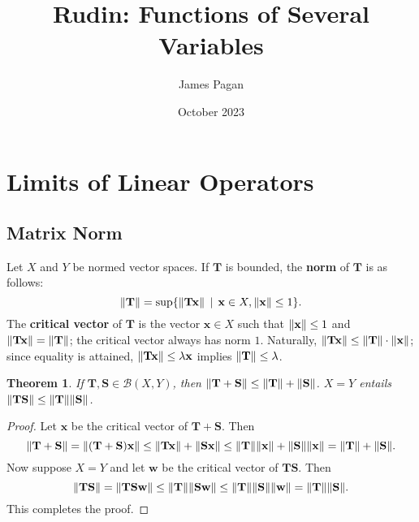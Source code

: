 \documentclass[11pt]{article}
\title{Rudin: Functions of Several Variables}
\author{James Pagan}
\date{October 2023}
\renewcommand{\vec}[1]{\mathbf{#1}}
\newcommand{\mat}[1]{\mathbf{#1}}
\newtheorem{theorem}{Theorem}
\begin{document}
\maketitle
\tableofcontents
\newpage


\section{Limits of Linear Operators}


\subsection{Matrix Norm}

Let $X$ and $Y$ be normed vector spaces. If $\mat{T}$ is bounded, the \textbf{norm} of $\mat{T}$ is as follows:
\[
	\norm{\mat{T}} = \sup \{ \norm{\mat{T} \vec{x}} \, \mid \, \vec{x} \in X, \norm{\vec{x}} \le 1\}.
\]
The \textbf{critical vector} of $\mat{T}$ is the vector $\vec{x} \in X$ such that $\norm{\vec{x}} \le 1$ and $\norm{\mat{T} \vec{x}} = \norm{\mat{T}}$; the critical vector always has norm $1$. Naturally, $\norm{\mat{T} \vec{x}} \le \norm{\mat{T}} \cdot \norm{\vec{x}}$; since equality is attained, $\norm{\mat{T} \vec{x}} \le \lambda \vec{x}$ implies $\norm{\vec{T}} \le \lambda$.

\begin{theorem}
	If $\mat{T}, \mat{S} \in \mathcal{B}(X, Y)$, then $\norm{\mat{T} + \mat{S}} \le \norm{\mat{T}} + \norm{\mat{S}}$. $X = Y$ entails $\norm{\mat{TS}} \le \norm{\mat{T}} \norm{\mat{S}}$.
\end{theorem}
\begin{adjustwidth}{0.5cm}{}
	\begin{proof}
		Let $\vec{x}$ be the critical vector of $\mat{T} + \mat{S}$. Then
		\[
			\norm{\mat{T} + \mat{S}} = \norm{(\mat{T} + \mat{S})\vec{x}} \le \norm{\mat{T} \vec{x}} + \norm{\mat{S} \vec{x}} \le \norm{\mat{T}} \norm{\vec{x}} + \norm{\mat{S}} \norm{\vec{x}} = \norm{\mat{T}} + \norm{\mat{S}}.
		\]
		Now suppose $X = Y$ and let $\vec{w}$ be the critical vector of $\mat{TS}$. Then
		\[
			\norm{\mat{TS}} = \norm{\mat{TS} \vec{w}} \le \norm{\mat{T}} \norm{\mat{S} \vec{w}} \le \norm{\mat{T}} \norm{\mat{S}} \norm{\vec{w}} = \norm{\mat{T}} \norm{\mat{S}}.
		\]
		This completes the proof.
	\end{proof}
\end{adjustwidth}
\end{document}
